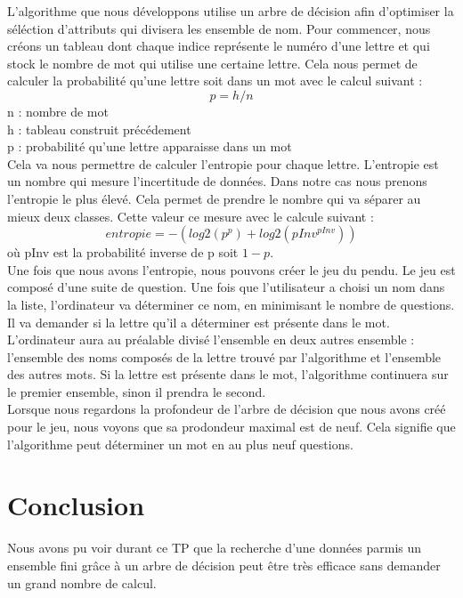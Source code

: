 \documentclass[a4paper,11pt]{article}
\begin{document}
  L'algorithme que nous développons utilise un arbre de décision afin d'optimiser la séléction d'attributs qui
  divisera les ensemble de nom. Pour commencer, nous créons un tableau dont chaque indice représente le numéro
  d'une lettre et qui stock le nombre de mot qui utilise une certaine lettre. Cela nous permet de calculer
  la probabilité qu'une lettre soit dans un mot avec le calcul suivant :
  $$ p = h / n $$
  n : nombre de mot\\
  h : tableau construit précédement\\
  p : probabilité qu'une lettre apparaisse dans un mot\\
  
  Cela va nous permettre de calculer l'entropie pour chaque lettre. L'entropie est un nombre qui mesure
  l'incertitude de données. Dans notre cas nous prenons l'entropie le plus élevé. Cela permet de prendre
  le nombre qui va séparer au mieux deux classes. Cette valeur ce mesure avec le calcule suivant :
  $$entropie = -(log2(p ^{p}) + log2(pInv ^{pInv}))$$
  où pInv est la probabilité inverse de p soit $1-p$.\\
  
  Une fois que nous avons l'entropie, nous pouvons créer le jeu du pendu. Le jeu est composé d'une suite de question.
  Une fois que l'utilisateur a choisi un nom dans la liste, l'ordinateur va déterminer ce nom, en minimisant le nombre de questions. Il va demander
  si la lettre qu'il a déterminer est présente dans le mot. L'ordinateur aura au préalable divisé l'ensemble en 
  deux autres ensemble : l'ensemble des noms composés de la lettre trouvé par l'algorithme et l'ensemble des autres mots. 
  Si la lettre est présente dans le mot, l'algorithme continuera sur le premier ensemble, sinon il prendra le second.\\
  
  Lorsque nous regardons la profondeur de l'arbre de décision que nous avons créé pour le jeu, nous voyons que 
  sa prodondeur maximal est de neuf. Cela signifie que l'algorithme peut déterminer un mot en au plus neuf
  questions.
  
  
  \section{Conclusion}
  Nous avons pu voir durant ce TP que la recherche d'une données parmis un ensemble fini grâce à un arbre de 
  décision peut être très efficace sans demander un grand nombre de calcul.
  
\end{document}
